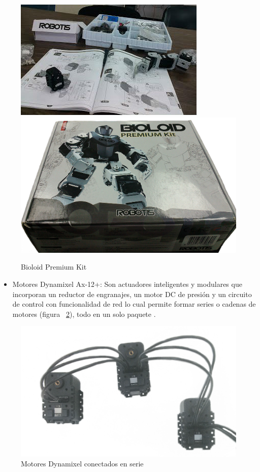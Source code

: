 \begin{figure}[hbtp]
\centering
\includegraphics[scale=0.5]{imagenes/kitAfuera.jpg}
\includegraphics[scale=0.07]{imagenes/cajaKit.jpg}
\caption{Bioloid Premium Kit}
\label{fig:kit}
\end{figure}



\begin{itemize}

\item Motores Dynamixel Ax-12+: Son actuadores inteligentes y modulares que incorporan un reductor de engranajes, un motor DC de presión y un circuito de control con funcionalidad de red lo cual permite formar series o cadenas de motores (figura ~\ref{fig:motoresDc}), todo en un solo paquete \cite{manual}. 
\end{itemize}

\begin{figure}[hbtp]

\centering
\includegraphics[scale=0.1]{imagenes/3Dynamixel.jpg}
\caption{Motores Dynamixel conectados en serie}
\label{fig:motoresDc}
\end{figure}

